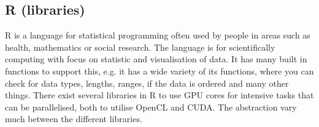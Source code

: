 \subsection{R (libraries)} %
R is a language for statistical programming often used by people in areas such as health, mathematics or social research.
The language is for scientifically computing with focus on statistic and visualisation of data.
It has many built in functions to support this, e.g. it has a wide variety of its functions, where you can check for data types, lengths, ranges, if the data is ordered and many other things.
There exist several libraries in R to use GPU cores for intensive tasks that can be parallelised, both to utilise OpenCL and CUDA. 
The abstraction vary much between the different libraries. 
\citep{R_history,R_speed}

                            
